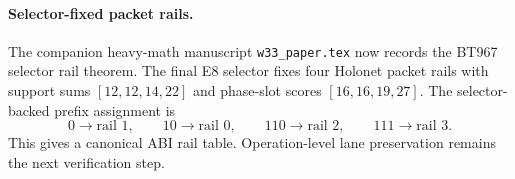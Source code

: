 
\paragraph{Selector-fixed packet rails.}
The companion heavy-math manuscript \texttt{w33\_paper.tex} now records the
BT967 selector rail theorem.  The final E8 selector fixes four Holonet packet
rails with support sums \([12,12,14,22]\) and phase-slot scores
\([16,16,19,27]\).  The selector-backed prefix assignment is
\[
  0\to\text{rail 1},\qquad
  10\to\text{rail 0},\qquad
  110\to\text{rail 2},\qquad
  111\to\text{rail 3}.
\]
This gives a canonical ABI rail table.  Operation-level lane preservation remains
the next verification step.

